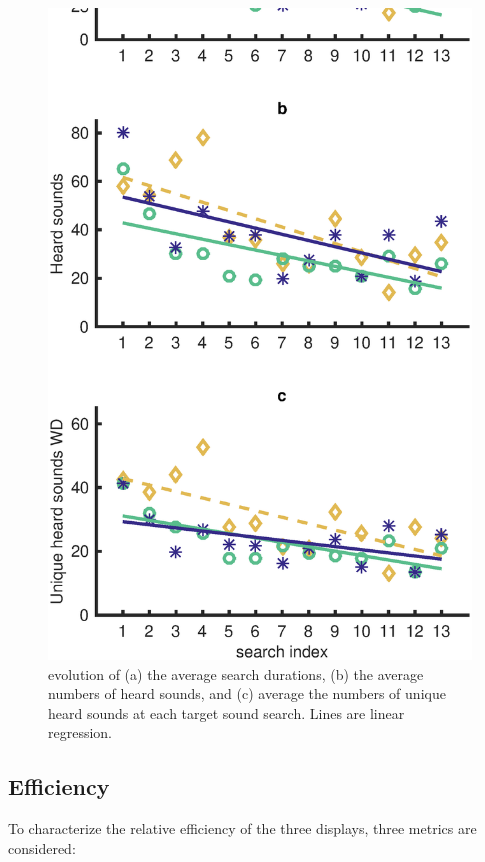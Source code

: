 \documentclass{aes2e}
\begin{document}
\begin{figure}[t]
\begin{center}
\includegraphics[scale=0.4]{gfx/analyse2.eps} 
\end{center}
\caption{\label{fig2} evolution of (a) the average search durations, (b) the average numbers of heard sounds, and (c) average the numbers of unique heard sounds at each target sound search. Lines are linear regression.}
\end{figure}


\subsection{Efficiency}

To characterize the relative efficiency of the three displays, three metrics are considered: 
\end{document}

